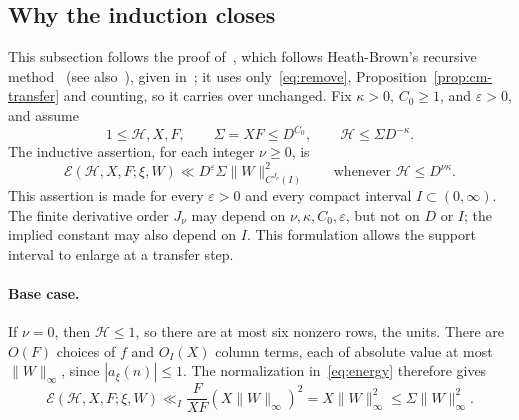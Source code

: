 \documentclass[11pt]{article}
\numberwithin{equation}{section}
\newcommand{\E}{\mathcal E}
\begin{document}
\subsection{Why the induction closes}
This subsection follows the proof of~\cite[Proposition~5.1]{OAI1112}, which follows Heath-Brown's recursive method~\cite[Lemma~8 and \S8]{HB95} (see also~\cite[Theorem~4.1]{GL}),
given in~\cite[Section~5.5]{OAI1112}; it uses only~\eqref{eq:remove},
Proposition~\ref{prop:cm-transfer} and counting, so it carries over
unchanged. Fix $\kappa>0$, $C_0\ge1$, and $\varepsilon>0$, and assume
\begin{equation}\label{eq:standing}
 1\le\mathcal H,X,F,\qquad \Sigma=XF\le D^{C_0},\qquad
 \mathcal H\le\Sigma D^{-\kappa}.
\end{equation}
The inductive assertion, for each integer $\nu\ge0$, is
\begin{equation}\label{eq:inductive}
 \E(\mathcal H,X,F;\xi,W)
 \ll D^\varepsilon\Sigma\|W\|_{C^{J_\nu}(I)}^2
 \qquad\text{whenever }\mathcal H\le D^{\nu\kappa}.
\end{equation}
This assertion is made for every $\varepsilon>0$ and every compact
interval $I\subset(0,\infty)$. The finite derivative order $J_\nu$ may
depend on $\nu,\kappa,C_0,\varepsilon$, but not on $D$ or $I$; the implied
constant may also depend on $I$. This formulation allows the support
interval to enlarge at a transfer step.

\paragraph{Base case.}
If $\nu=0$, then $\mathcal H\le1$, so there are at most six nonzero
rows, the units. There are $O(F)$ choices of $f$ and $O_I(X)$ column
terms, each of absolute value at most $\|W\|_\infty$, since
$|a_\xi(n)|\le1$. The normalization in~\eqref{eq:energy} therefore gives
\begin{equation}\label{eq:basecase}
 \E(\mathcal H,X,F;\xi,W)
 \ll_I\frac{F}{XF}(X\|W\|_\infty)^2
 =X\|W\|_\infty^2\le\Sigma\|W\|_\infty^2.
\end{equation}
\end{document}
